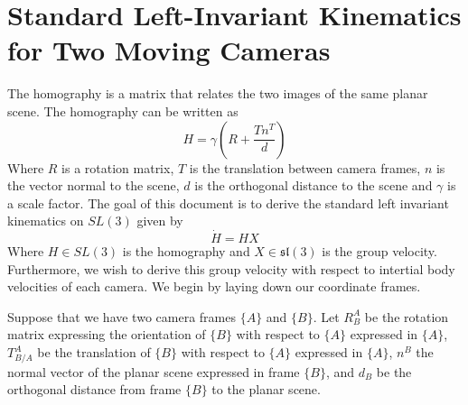 \documentclass[a4paper]{article}
\begin{document}
\section*{Standard Left-Invariant Kinematics for Two Moving Cameras}
The homography is a matrix that relates the two images of the same planar scene. The homography can be written as
\[
    H = \gamma \left( R + \frac{Tn^T}{d} \right)
\]
Where $R$ is a rotation matrix, $T$ is the translation between camera frames, $n$ is the vector normal to the scene, $d$ is the orthogonal distance to the scene and $\gamma$ is a scale factor. The goal of this document is to derive the standard left invariant kinematics on $SL(3)$ given by
\[
    \dot{H} = HX
\]
Where $H \in SL(3)$ is the homography and $X \in \mathfrak{sl}(3)$ is the group velocity. Furthermore, we wish to derive this group velocity with respect to intertial body velocities of each camera. We begin by laying down our coordinate frames.

Suppose that we have two camera frames $\{A\}$ and $\{B\}$. Let $R_B^A$ be the rotation matrix expressing the orientation of $\{B\}$ with respect to $\{A\}$ expressed in $\{A\}$, $T_{B/A}^A$ be the translation of $\{B\}$ with respect to $\{A\}$ expressed in $\{A\}$, $n^B$ the normal vector of the planar scene expressed in frame $\{B\}$, and $d_B$ be the orthogonal distance from frame $\{B\}$ to the planar scene.
\end{document}
